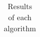 \begin{table}[H]
\centering
\begin{tabular}{|c|}
\hline
 
\end{tabular}
\caption{Results of each algorithm}
\label{Results of each algorithm}
\end{table}
